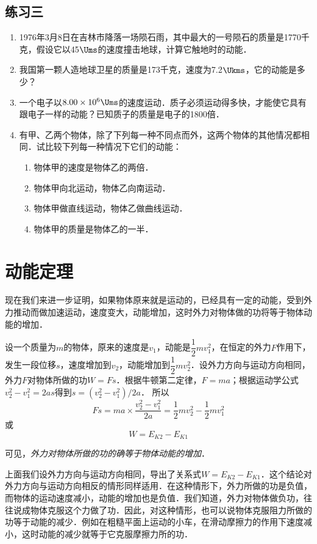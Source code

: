 \subsection*{练习三}
\begin{enumerate}
    \item 1976年3月8日在吉林市降落一场陨石雨，其中最大的一号陨石的质量是1770千克，假设它以45$\Ums$的速度撞击地球，计算它触地时的动能．
    \item 我国第一颗人造地球卫星的质量是173千克，速度为7.2$\Ukms$，它的动能是多少？
    \item 一个电子以$8.00\times 10^6\Ums$的速度运动．质子必须运动得多快，才能使它具有跟电子一样的动能？已知质子的质量是电子的1800倍．
    \item 有甲、乙两个物体，除了下列每一种不同点而外，这两个物体的其他情况都相同．试比较下列每一种情况下它们的动能：
    \begin{enumerate}
        \item 物体甲的速度是物体乙的两倍．
        \item 物体甲向北运动，物体乙向南运动．
        \item 物体甲做直线运动，物体乙做曲线运动．
        \item 物体甲的质量是物体乙的一半．
    \end{enumerate}
\end{enumerate}

\section{动能定理}

现在我们来进一步证明，如果物体原来就是运动的，已经具有一定的动能，受到外力推动而做加速运动，速度变大，动能增加，这时外力对物体做的功将等于物体动能的增加．

设一个质量为$m$的物体，原来的速度是$v_1$，动能是$\dfrac{1}{2}mv^2_1$，在恒定的外力$F$作用下，发生一段位移$s$，速度增加到$v_2$，动能增加到$\dfrac{1}{2}mv^2_2$．设外力方向与运动方向相同，外力$F$对物体所做的功$W=Fs$．根据牛顿第二定律，$F=ma$；根据运动学公式$v^2_2-v^2_1=2as$得到$s=(v^2_2-v^2_1)/2a$．
所以
\[Fs=ma\times \frac{v^2_2-v^2_1}{2a}=\frac{1}{2}mv^2_2-\frac{1}{2}mv^2_1 \]
或
\[W=E_{K2}-E_{K1}\]

可见，\textit{外力对物体所做的功的确等于物体动能的增加}．

上面我们设外力方向与运动方向相同，导出了关系式$W=E_{K2}-E_{K1}$．这个结论对外力方向与运动方向相反的情形同样适用．在这种情形下，外力所做的功是负值，而物体的运动速度减小，动能的增加也是负值．我们知道，外力对物体做负功，往往说成物体克服这个力做了功．因此，对这种情形，也可以说物体克服阻力所做的功等于动能的减少．例如在粗糙平面上运动的小车，在滑动摩擦力的作用下速度减小，这时动能的减少就等于它克服摩擦力所的功．	
	
